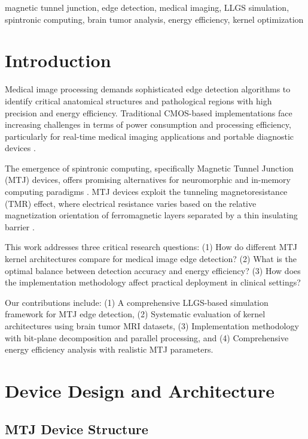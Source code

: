 \documentclass[conference]{IEEEtran}
\begin{document}
\begin{IEEEkeywords}
magnetic tunnel junction, edge detection, medical imaging, LLGS simulation, spintronic computing, brain tumor analysis, energy efficiency, kernel optimization
\end{IEEEkeywords}

\section{Introduction}

Medical image processing demands sophisticated edge detection algorithms to identify critical anatomical structures and pathological regions with high precision and energy efficiency. Traditional CMOS-based implementations face increasing challenges in terms of power consumption and processing efficiency, particularly for real-time medical imaging applications and portable diagnostic devices \cite{chen2021low}.

The emergence of spintronic computing, specifically Magnetic Tunnel Junction (MTJ) devices, offers promising alternatives for neuromorphic and in-memory computing paradigms \cite{sengupta2021magnetic}. MTJ devices exploit the tunneling magnetoresistance (TMR) effect, where electrical resistance varies based on the relative magnetization orientation of ferromagnetic layers separated by a thin insulating barrier \cite{yuasa2004giant}.

This work addresses three critical research questions: (1) How do different MTJ kernel architectures compare for medical image edge detection? (2) What is the optimal balance between detection accuracy and energy efficiency? (3) How does the implementation methodology affect practical deployment in clinical settings?

Our contributions include: (1) A comprehensive LLGS-based simulation framework for MTJ edge detection, (2) Systematic evaluation of kernel architectures using brain tumor MRI datasets, (3) Implementation methodology with bit-plane decomposition and parallel processing, and (4) Comprehensive energy efficiency analysis with realistic MTJ parameters.

\section{Device Design and Architecture}

\subsection{MTJ Device Structure}
\end{document}
